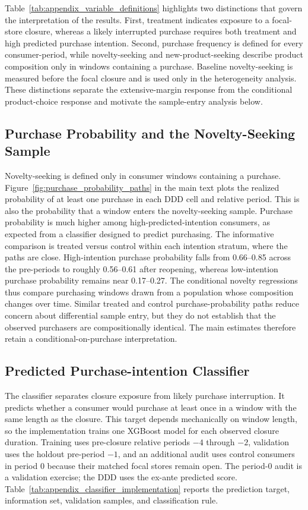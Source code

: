 \documentclass[11 pt]{article}
\begin{document}
Table~\ref{tab:appendix_variable_definitions} highlights two distinctions that govern the interpretation of the results. First, treatment indicates exposure to a focal-store closure, whereas a likely interrupted purchase requires both treatment and high predicted purchase intention. Second, purchase frequency is defined for every consumer-period, while novelty-seeking and new-product-seeking describe product composition only in windows containing a purchase. Baseline novelty-seeking is measured before the focal closure and is used only in the heterogeneity analysis. These distinctions separate the extensive-margin response from the conditional product-choice response and motivate the sample-entry analysis below.

\subsection{Purchase Probability and the Novelty-Seeking Sample}
\label{app:purchase_probability}

Novelty-seeking is defined only in consumer windows containing a purchase. Figure~\ref{fig:purchase_probability_paths} in the main text plots the realized probability of at least one purchase in each DDD cell and relative period. This is also the probability that a window enters the novelty-seeking sample. Purchase probability is much higher among high-predicted-intention consumers, as expected from a classifier designed to predict purchasing. The informative comparison is treated versus control within each intention stratum, where the paths are close. High-intention purchase probability falls from 0.66--0.85 across the pre-periods to roughly 0.56--0.61 after reopening, whereas low-intention purchase probability remains near 0.17--0.27. The conditional novelty regressions thus compare purchasing windows drawn from a population whose composition changes over time. Similar treated and control purchase-probability paths reduce concern about differential sample entry, but they do not establish that the observed purchasers are compositionally identical. The main estimates therefore retain a conditional-on-purchase interpretation.

\subsection{Predicted Purchase-intention Classifier}
\label{app:classifier_details}

The classifier separates closure exposure from likely purchase interruption. It predicts whether a consumer would purchase at least once in a window with the same length as the closure. This target depends mechanically on window length, so the implementation trains one XGBoost model for each observed closure duration. Training uses pre-closure relative periods $-4$ through $-2$, validation uses the holdout pre-period $-1$, and an additional audit uses control consumers in period $0$ because their matched focal stores remain open. The period-$0$ audit is a validation exercise; the DDD uses the ex-ante predicted score. Table~\ref{tab:appendix_classifier_implementation} reports the prediction target, information set, validation samples, and classification rule.
\end{document}
